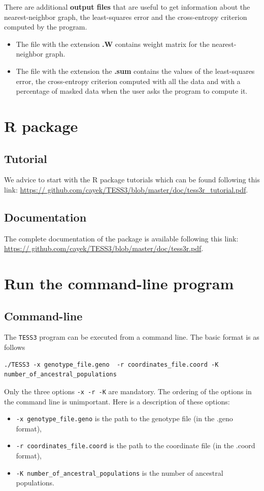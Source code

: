 \documentclass[10pt,a4paper]{article}
\begin{document}
There are additional {\bf output files} that are useful to get information about 
the nearest-neighbor graph, the least-squares error and the cross-entropy 
criterion computed by the program.

\begin{itemize}
\item The file with the extension {\bf .W} contains weight matrix for the 
nearest-neighbor graph.
\item The file with the extension the {\bf .sum} contains the values of the 
least-squares error, the cross-entropy criterion computed with all the data and 
with a percentage of masked data when the user asks the program to compute it.
\end{itemize}

\section{R package}

\subsection{Tutorial}
We advice to start with the R package tutorials which can be found following this link: \url{https://
github.com/cayek/TESS3/blob/master/doc/tess3r_tutorial.pdf}.

\subsection{Documentation}
The complete documentation of the package is available following this link: \url{https://
github.com/cayek/TESS3/blob/master/doc/tess3r.pdf}.


\section{Run the command-line program}
\subsection{Command-line}
The {\tt TESS3} program can be executed from a command line. The basic format is 
as follows
\begin{Verbatim}[frame=single]
./TESS3 -x genotype_file.geno  -r coordinates_file.coord -K 
number_of_ancestral_populations
\end{Verbatim}

\noindent
Only the three options {\tt -x -r -K}  are mandatory. The ordering of the 
options in the command line is unimportant. Here is a description of these 
options:
\begin{itemize}
\item \verb|-x genotype_file.geno| is the path to the genotype file (in the 
.geno format),
\item \verb|-r coordinates_file.coord| is the path to the coordinate file (in 
the .coord format),
\item \verb|-K number_of_ancestral_populations| is the number of ancestral 
populations.
\end{itemize}
\end{document}
